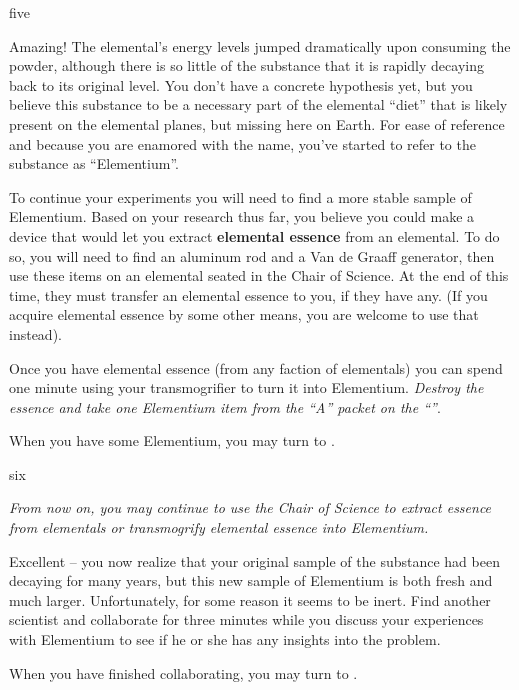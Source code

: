 \documentclass[notebook]{elementals}
\begin{document}
\begin{page}{five}

Amazing! The elemental's energy levels jumped dramatically upon consuming the powder, although there is so little of the substance that it is rapidly decaying back to its original level. You don't have a concrete hypothesis yet, but you believe this substance to be a necessary part of the elemental ``diet'' that is likely present on the elemental planes, but missing here on Earth. For ease of reference and because you are enamored with the name, you've started to refer to the substance as ``Elementium''.

To continue your experiments you will need to find a more stable sample of Elementium. Based on your research thus far, you believe you could make a device that would let you extract \textbf{elemental essence} from an elemental. To do so, you will need to find an aluminum rod and a Van de Graaff generator, then use these items on an elemental seated in the Chair of Science. At the end of this time, they must transfer an elemental essence to you, if they have any. (If you acquire elemental essence by some other means, you are welcome to use that instead).

Once you have elemental essence (from any faction of elementals) you can spend one minute using your transmogrifier to turn it into Elementium. \emph{Destroy the essence and take one Elementium item from the ``A'' packet on the ``\sAziSciLabBench{}''}.

When you have some Elementium, you may turn to .

\end{page}

\begin{page}{six}

\emph{From now on, you may continue to use the Chair of Science to extract essence from elementals or transmogrify elemental essence into Elementium.}

Excellent -- you now realize that your original sample of the substance had been decaying for many years, but this new sample of Elementium is both fresh and much larger. Unfortunately, for some reason it seems to be inert. Find another scientist and collaborate for three minutes while you discuss your experiences with Elementium to see if he or she has any insights into the problem.

When you have finished collaborating, you may turn to .

\end{page}
\end{document}
